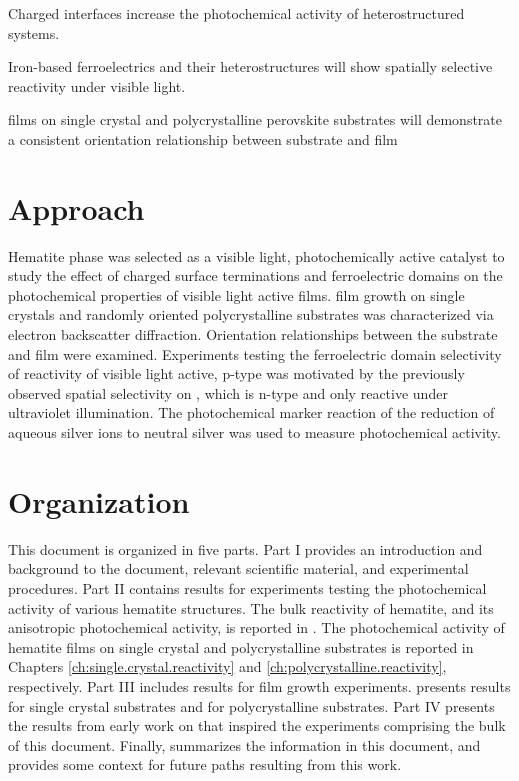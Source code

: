 \begin{items}
	\item Charged interfaces increase the photochemical activity of heterostructured systems.
	\item Iron-based ferroelectrics and their heterostructures will show spatially selective reactivity under visible light.
	\item {} films on  single crystal and polycrystalline perovskite substrates will demonstrate a consistent orientation relationship between substrate and film
\end{items}

\section{Approach}
\label{sec:intro.approach}

Hematite phase  was selected as a visible light, photochemically active catalyst to study the effect of charged surface terminations and ferroelectric domains on the photochemical properties of visible light active films.  film growth on  single crystals and randomly oriented polycrystalline  substrates was characterized via electron backscatter diffraction. Orientation relationships between the substrate and film were examined. Experiments testing the ferroelectric domain selectivity of reactivity of visible light active, p-type  was motivated by the previously observed spatial selectivity on , which is n-type and only reactive under ultraviolet illumination. The photochemical marker reaction of the reduction of aqueous silver ions to neutral silver was used to measure photochemical activity.

\section{Organization}
\label{sec:intro.organization}

This document is organized in five parts. Part I provides an introduction and background to the document, relevant scientific material, and experimental procedures. Part II contains results for experiments testing the photochemical activity of various hematite structures. The bulk reactivity of hematite, and its anisotropic photochemical activity, is reported in . The photochemical activity of hematite films on single crystal and polycrystalline substrates is reported in Chapters \ref{ch:single.crystal.reactivity} and \ref{ch:polycrystalline.reactivity}, respectively. Part III includes results for film growth experiments.  presents results for single crystal substrates and  for polycrystalline substrates. Part IV presents the results from early work on  that inspired the experiments comprising the bulk of this document. Finally,  summarizes the information in this document, and provides some context for future paths resulting from this work.